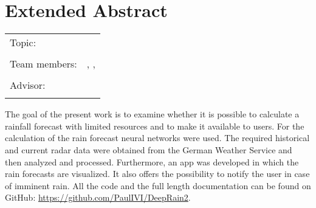 \chapter*{Extended Abstract}

\begin{center}
	\begingroup
	\renewcommand*{\arraystretch}{1}
	{\makeatletter	
		\begin{tabular}{p{3.2cm}p{9.6cm}}
			Topic: & \thema \\
			& \\
			Team members: & \verfasserA, \verfasserB, \verfasserC \\
			& \\
			Advisor: & \hoschschule \newline \institut \newline \prueferA \\
			& \\
		\end{tabular}
		
		\makeatother}
	\endgroup
\end{center}

\bigskip

\noindent

The goal of the present work is to examine whether it is possible to calculate a rainfall forecast with limited resources and to make it available to users. 
For the calculation of the rain forecast neural networks were used. 
The required historical and current radar data were obtained from the German Weather Service and then analyzed and processed. 
Furthermore, an app was developed in which the rain forecasts are visualized.  
It also offers the possibility to notify the user in case of imminent rain. 
All the code and the full length documentation can be found on GitHub: \url{https://github.com/PaulIVI/DeepRain2}.

\printbibliography[title={References}, heading=subbibliography]

